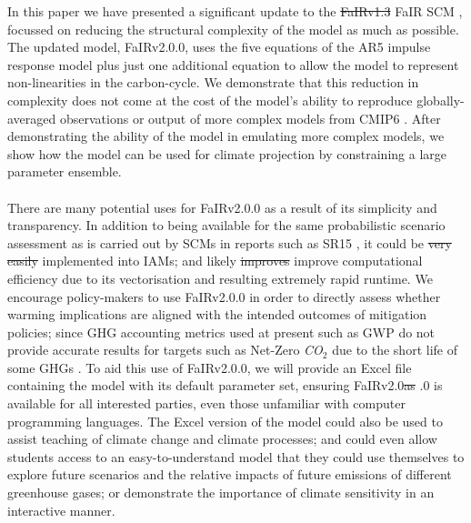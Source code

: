 \documentclass[gmd, manuscript]{copernicus}
\providecommand{\DIFadd}[1]{{\protect\color{blue}#1}} %
\providecommand{\DIFdel}[1]{{\protect\color{red}\sout{#1}}}                      %
\providecommand{\DIFaddbegin}{} %
\providecommand{\DIFaddend}{} %
\providecommand{\DIFdelbegin}{} %
\providecommand{\DIFdelend}{} %
\begin{document}
\DIFaddend %
\conclusions  %
In this paper we have presented a significant update to the \DIFdelbegin \DIFdel{FaIRv1.3 }\DIFdelend \DIFaddbegin \DIFadd{FaIR }\DIFaddend SCM \citep{Smith2018}, focussed on reducing the structural complexity of the model as much as possible. The updated model, FaIRv2.0\DIFaddbegin \DIFadd{.0}\DIFaddend , uses the five equations of the AR5 impulse response model \citep{Myhre2013a} plus just one additional equation to allow the model to represent non-linearities in the carbon-cycle. We demonstrate that this reduction in complexity does not come at the cost of the model’s ability to reproduce globally-averaged observations or output of more complex models from CMIP6 \citep{Eyring2016}. After demonstrating the ability of the model in emulating more complex models, we show how the model can be used for climate projection by constraining a large parameter ensemble.\\\\
%
There are many potential uses for FaIRv2.0\DIFaddbegin \DIFadd{.0 }\DIFaddend as a result of its simplicity and transparency. In addition to being available for the same probabilistic scenario assessment as is carried out by SCMs in reports such as SR15 \citep{IPCC2018}, it could be \DIFdelbegin \DIFdel{very easily }\DIFdelend implemented into IAMs; and likely \DIFdelbegin \DIFdel{improves }\DIFdelend \DIFaddbegin \DIFadd{improve }\DIFaddend computational efficiency due to its vectorisation and resulting extremely rapid runtime. We encourage policy-makers to use FaIRv2.0\DIFaddbegin \DIFadd{.0 }\DIFaddend in order to directly assess whether warming implications are aligned with the intended outcomes of mitigation policies; since GHG accounting metrics used at present such as GWP do not provide accurate results for targets such as Net-Zero \emph{CO$_2$} due to the short life of some GHGs \citep{Allen2018a}. To aid this use of FaIRv2.0\DIFaddbegin \DIFadd{.0}\DIFaddend , we will provide an Excel file containing the model with its default parameter set, ensuring FaIRv2.0\DIFdelbegin \DIFdel{as }\DIFdelend \DIFaddbegin \DIFadd{.0 is }\DIFaddend available for all interested parties, even those unfamiliar with computer programming languages. The Excel version of the model could also be used to assist teaching of climate change and climate processes; and could even allow students access to an easy-to-understand model that they could use themselves to explore future scenarios and the relative impacts of future emissions of different greenhouse gases; or demonstrate the importance of climate sensitivity in an interactive manner.\\\\
\end{document}
